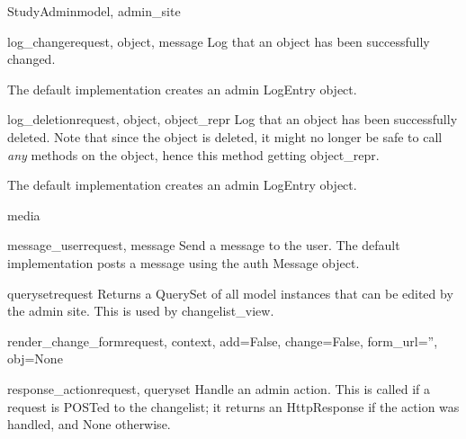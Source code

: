 \documentclass[letterpaper,10pt,english]{sphinxmanual}
\begin{document}
\begin{classdesc}{StudyAdmin}{model, admin\_site}
\hypertarget{data.admin.StudyAdmin.log_change}{}\begin{methoddesc}{log\_change}{request, object, message}
Log that an object has been successfully changed.

The default implementation creates an admin LogEntry object.
\end{methoddesc}

\hypertarget{data.admin.StudyAdmin.log_deletion}{}\begin{methoddesc}{log\_deletion}{request, object, object\_repr}
Log that an object has been successfully deleted. Note that since the
object is deleted, it might no longer be safe to call \emph{any} methods
on the object, hence this method getting object\_repr.

The default implementation creates an admin LogEntry object.
\end{methoddesc}

\hypertarget{data.admin.StudyAdmin.media}{}\begin{memberdesc}{media}\end{memberdesc}

\hypertarget{data.admin.StudyAdmin.message_user}{}\begin{methoddesc}{message\_user}{request, message}
Send a message to the user. The default implementation
posts a message using the auth Message object.
\end{methoddesc}

\hypertarget{data.admin.StudyAdmin.queryset}{}\begin{methoddesc}{queryset}{request}
Returns a QuerySet of all model instances that can be edited by the
admin site. This is used by changelist\_view.
\end{methoddesc}

\hypertarget{data.admin.StudyAdmin.render_change_form}{}\begin{methoddesc}{render\_change\_form}{request, context, add=False, change=False, form\_url='', obj=None}\end{methoddesc}

\hypertarget{data.admin.StudyAdmin.response_action}{}\begin{methoddesc}{response\_action}{request, queryset}
Handle an admin action. This is called if a request is POSTed to the
changelist; it returns an HttpResponse if the action was handled, and
None otherwise.
\end{methoddesc}


\end{classdesc}
\end{document}
